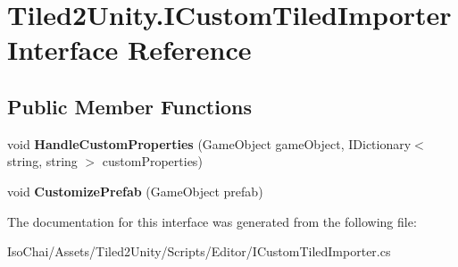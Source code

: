 \hypertarget{interface_tiled2_unity_1_1_i_custom_tiled_importer}{}\section{Tiled2\+Unity.\+I\+Custom\+Tiled\+Importer Interface Reference}
\label{interface_tiled2_unity_1_1_i_custom_tiled_importer}
\subsection*{Public Member Functions}
\begin{DoxyCompactItemize}
\item 
\mbox{\label{interface_tiled2_unity_1_1_i_custom_tiled_importer_af4c9e46be5df1af5cbd4ac2114c8fcd8}} 
void {\bfseries Handle\+Custom\+Properties} (Game\+Object game\+Object, I\+Dictionary$<$ string, string $>$ custom\+Properties)
\item 
\mbox{\label{interface_tiled2_unity_1_1_i_custom_tiled_importer_af2334f3b1851b0f84ba8b1035333cffd}} 
void {\bfseries Customize\+Prefab} (Game\+Object prefab)
\end{DoxyCompactItemize}


The documentation for this interface was generated from the following file\+:\begin{DoxyCompactItemize}
\item 
Iso\+Chai/\+Assets/\+Tiled2\+Unity/\+Scripts/\+Editor/I\+Custom\+Tiled\+Importer.\+cs\end{DoxyCompactItemize}
